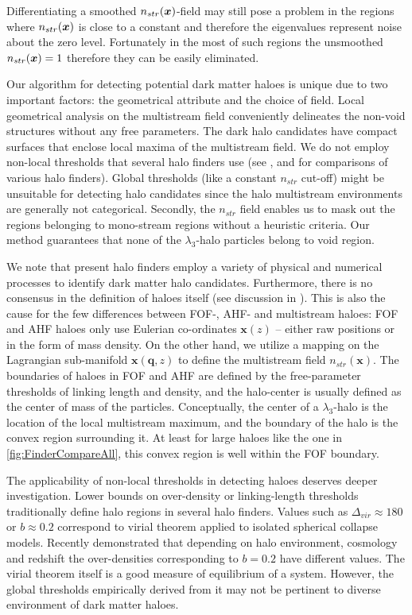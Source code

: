 \documentclass[fleqn,usenatbib,useAMS]{mnras}
\begin{document}
Differentiating a smoothed  $n_{str}(\bmath{x})$-field may still pose a problem in the regions where $n_{str}(\bmath{x})$ is close to a constant and therefore the eigenvalues represent noise about the zero level. Fortunately in the most of such regions the unsmoothed $n_{str}(\bmath{x}) =1$ therefore they can be easily eliminated.

Our algorithm for detecting potential dark matter haloes is unique due to two important factors: the geometrical attribute and the choice of field. Local geometrical analysis on the multistream field conveniently delineates the non-void structures without any free parameters. The dark halo candidates have compact surfaces that enclose local maxima of the multistream field. We do not employ non-local thresholds that several halo finders use (see \citealt{Knebe2011a}, \citealt{Knebe2013} and \citealt{Onions2012} for comparisons of various halo finders). Global thresholds (like a constant $n_{str}$ cut-off) might be unsuitable for detecting halo candidates since the halo multistream environments are generally not categorical. Secondly, the $n_{str}$ field enables us to mask out the regions belonging to mono-stream regions without a heuristic criteria. Our method guarantees that none of the $\lambda_3$-halo particles belong to void region. 


We note that present halo finders employ a variety of physical and numerical processes to identify dark matter halo candidates. Furthermore, there is no consensus in the definition of haloes itself (see discussion in \citealt{Knebe2011a}). This is also the cause for the few differences between FOF-, AHF- and multistream haloes: FOF and AHF haloes only use Eulerian co-ordinates $\mathbf{x}(z)$ -- either raw positions or in the form of mass density. On the other hand, we utilize a mapping on the Lagrangian sub-manifold $\mathbf{x}(\mathbf{q}, z)$ to define the multistream field $n_{str}(\mathbf{x})$. The boundaries of haloes in FOF and AHF are defined by the free-parameter thresholds of linking length and density, and the halo-center is usually defined as the center of mass of the particles. Conceptually, the center of a $\lambda_3$-halo is the location of the local multistream maximum, and the boundary of the halo is the convex region surrounding it. At least for large haloes like the one in \autoref{fig:FinderCompareAll}, this convex region is well within the FOF boundary.  

The applicability of non-local thresholds in detecting haloes deserves deeper investigation. Lower bounds on over-density or linking-length thresholds traditionally define halo regions in several halo finders. Values such as $\Delta_{vir} \approx 180$ or $b \approx 0.2$ correspond to virial theorem applied to isolated spherical collapse models. Recently \cite{More2011} demonstrated that depending on halo environment, cosmology and redshift the over-densities corresponding to $b = 0.2$ have different values. The virial theorem itself is a good measure of equilibrium of a system. However, the global thresholds empirically derived from it may not be pertinent to diverse environment of dark matter haloes. 
\end{document}
